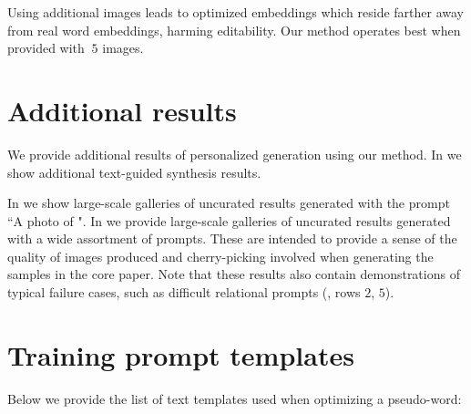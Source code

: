 Using additional images leads to optimized embeddings which reside farther away from real word embeddings, harming editability. Our method operates best when provided with $~5$ images.


\section{Additional results}



We provide additional results of personalized generation using our method. In  we show additional text-guided synthesis results.

In  we show large-scale galleries of uncurated results generated with the prompt ``A photo of \pholdercolor". In  we provide large-scale galleries of uncurated results generated with a wide assortment of prompts. These are intended to provide a sense of the quality of images produced and cherry-picking involved when generating the samples in the core paper. Note that these results also contain demonstrations of typical failure cases, such as difficult relational prompts (, rows $2$, $5$).






\clearpage

\section{Training prompt templates}
Below we provide the list of text templates used when optimizing a pseudo-word:

